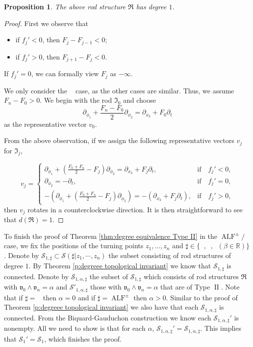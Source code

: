 \documentclass[a4paper,11pt]{amsart}
\newtheorem{proposition}[theorem]{Proposition}
\theoremstyle{definition}
\numberwithin{equation}{section}
\newcommand{\R}{\mathbb{R}}
\newcommand{\mv} {\mathfrak v}
\newcommand{\mR} {\mathfrak R}
\DeclareMathOperator{\II}{II}
\DeclareMathOperator{\ALF}{ALF}
\DeclareMathOperator{\ALFp}{ALF^+}
\DeclareMathOperator{\ALFm}{ALF^{--}}
\DeclareMathOperator{\AFa}{AF_\beta}
\begin{document}
\begin{proposition}
    The above rod structure $\mR$ has degree $1$.
    \end{proposition}
\begin{proof}
 First we observe that 
\begin{itemize}
    \item if $f_j'<0$, then $F_j-F_{j-1}<0$;
    \item if $f_j'>0$, then $F_{j+1}-F_j<0$.
\end{itemize}
If $f_j'=0$, we can formally view $F_j$ as $-\infty$. 

We only consider the $\ALFm$ case, as the other cases are similar. Thus, we assume $F_n - F_0 > 0$.  
We begin with the rod $\mathfrak{I}_0$ and choose  
\[
\partial_{\phi_1} + \frac{F_n - F_0}{2} \partial_{\phi_2} = \partial_{x_3} + F_0 \partial_t
\]  
as the representative vector $v_0$.  

From the above observation, if we assign the following representative vectors $v_j$ for $\mathfrak{I}_j$,  

\begin{equation}
    v_j=\begin{cases}
        \partial_{\phi_1} + \left( \frac{F_0 + F_n}{2} - F_j \right) \partial_{\phi_2} = \partial_{x_3} + F_j \partial_t, & \text{if} \quad f_j' < 0, \\
        \partial_{\phi_2} = -\partial_t, & \text{if} \quad f_j' = 0, \\
        -\left( \partial_{\phi_1} + \left( \frac{F_0 + F_n}{2} - F_j \right) \partial_{\phi_2} \right) = -(\partial_{x_3} + F_j \partial_t), & \text{if} \quad f_j' > 0,
    \end{cases}
\end{equation}  
then $v_j$ rotates in a counterclockwise direction. It is then straightforward to see that $d(\mathfrak{R}) = 1$.  
\end{proof}


To finish the proof of Theorem \ref{thm:degree equivalence Type II} in the $\ALF^\pm/\AFa$ case, we fix the  positions of the turning points $z_1,\ldots,z_n$ and $\sharp\in \{\ALFm, \ALFp, \AFa (\beta\in \R)\}$. Denote by $\mathcal{S}_{1,\sharp}\subset\mathcal S(\sharp|z_1, \cdots, z_n)$ the subset consisting of rod structures  of degree $1$. By Theorem \ref{p:degreee topological invariant} we know that $\mathcal S_{1,\sharp}$ is connected.  Denote by $\mathcal S_{1,\alpha,\sharp}$ the subset of $\mathcal S_{1,\sharp}$ which consists of rod structures $\mR$ with $\mv_{0}\wedge\mv_{n}=\alpha$ and $\mathcal{S}'_{1,\alpha,\sharp}$ those with $\mv_{0}\wedge\mv_{n}=\alpha$ that are of Type $\II$.  Note that if $\sharp=\AFa$ then $\alpha=0$ and if $\sharp=\ALF^\pm$ then $\alpha>0$. Similar to the proof of Theorem \ref{p:degreee topological invariant} we also have that each $\mathcal S_{1,\alpha,\sharp}$ is connected. From the Biquard-Gauduchon construction we know each $\mathcal S_{1,\alpha,\sharp}'$ is nonempty. All we need to show is that for each $\alpha$, $\mathcal{S}_{1,\alpha,\sharp}'=\mathcal{S}_{1,\alpha,\sharp}$. This implies that $\mathcal S_1'=\mathcal{S}_1$, which finishes the proof.
\end{document}
